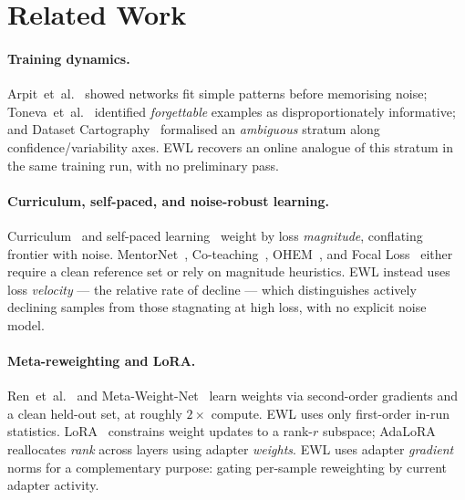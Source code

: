 \section{Related Work}
\label{sec:related}

\paragraph{Training dynamics.}
Arpit~et~al.~\cite{arpit2017closer} showed networks fit simple patterns before
memorising noise; Toneva~et~al.~\cite{toneva2019empirical} identified
\emph{forgettable} examples as disproportionately informative; and Dataset
Cartography~\cite{swayamdipta2020dataset} formalised an \emph{ambiguous}
stratum along confidence/variability axes.
EWL recovers an online analogue of this stratum in the same training run, with
no preliminary pass.

\paragraph{Curriculum, self-paced, and noise-robust learning.}
Curriculum~\cite{bengio2009curriculum} and self-paced
learning~\cite{kumar2010self} weight by loss \emph{magnitude}, conflating
frontier with noise.
MentorNet~\cite{jiang2018mentornet}, Co-teaching~\cite{han2018coteaching},
OHEM~\cite{shrivastava2016ohem}, and Focal Loss~\cite{lin2017focal} either
require a clean reference set or rely on magnitude heuristics.
EWL instead uses loss \emph{velocity} --- the relative rate of decline --- which
distinguishes actively declining samples from those stagnating at high loss,
with no explicit noise model.

\paragraph{Meta-reweighting and LoRA.}
Ren~et~al.~\cite{ren2018learning} and Meta-Weight-Net~\cite{shu2019meta} learn
weights via second-order gradients and a clean held-out set, at roughly
$2\times$ compute.
EWL uses only first-order in-run statistics.
LoRA~\cite{hu2022lora} constrains weight updates to a rank-$r$ subspace;
AdaLoRA~\cite{zhang2023adalora} reallocates \emph{rank} across layers using
adapter \emph{weights}.
EWL uses adapter \emph{gradient} norms for a complementary purpose: gating
per-sample reweighting by current adapter activity.
